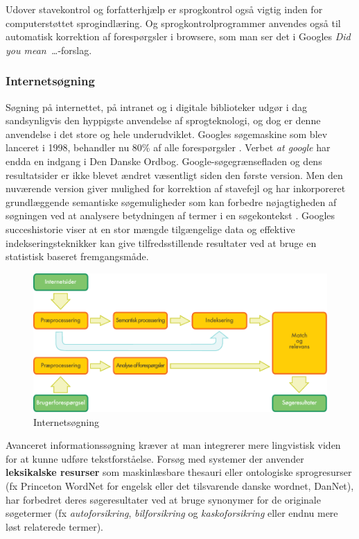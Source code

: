 \begin{multicols}{2}
Udover stavekontrol og forfatterhj\ae lp er sprogkontrol \mbox{ogs\aa} vigtig inden for computerst\o ttet sprogindl\ae ring. Og sprogkontrolprogrammer anvendes \mbox{ogs\aa} til automatisk korrektion af foresp\o rgsler i browsere, som man ser det i Googles {\it Did you mean~\dots}-forslag.


\subsubsection{Internets\o gning}

S\o gning \mbox{p\aa} internettet, \mbox{p\aa} intranet og i digitale biblioteker udg\o r i dag sandsynligvis den hyppigste anvendelse af sprogteknologi, og dog er denne anvendelse i det store og hele underudviklet. Googles s\o gemaskine som blev lanceret i 1998, behandler nu 80\% af alle foresp\o rgsler \cite{spi1}.   Verbet {\it at google} har endda en indgang i Den Danske Ordbog. Google-s\o gegr\ae nsefladen og dens resultatsider er ikke blevet \ae ndret v\ae sentligt siden den f\o rste version. Men den nuv\ae rende version giver mulighed for korrektion af stavefejl og har inkorporeret grundl\ae ggende semantiske s\o gemuligheder som kan forbedre n\o jagtigheden af s\o gningen ved at analysere betydningen af termer i en s\o gekontekst \cite{pc1}.   Googles succeshistorie viser at en stor m\ae ngde tilg\ae ngelige data og effektive indekseringsteknikker kan give tilfredsstillende resultater ved at bruge en statistisk baseret fremgangsm\aa de.

\begin{figure}[htb]
  \center
  \includegraphics[width=\textwidth]{../_media/danish/web_search_architecture}
  \caption{Internetsøgning}
  \label{fig:websearcharch_de}
\end{figure}

Avanceret informationss\o gning kr\ae ver at man integrerer mere lingvistisk viden for at kunne udf\o re tekstforst\aa else. Fors\o g med systemer der anvender {\bf leksikalske resurser} som maskinl\ae sbare thesauri eller ontologiske sprogresurser (fx Princeton WordNet for engelsk eller det tilsvarende danske wordnet, DanNet), har forbedret deres s\o geresultater ved at bruge synonymer for de originale s\o getermer (fx {\it autoforsikring}, {\it bilforsikring} og {\it kaskoforsikring} eller endnu mere l\o st relaterede termer). 


\end{multicols}

